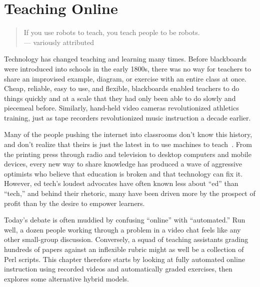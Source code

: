 \chapter{Teaching Online}\label{s:online}

\begin{quote}

  If you use robots to teach, you teach people to be robots. \\
  --- variously attributed

\end{quote}

Technology has changed teaching and learning many times.
Before blackboards were introduced into schools in the early 1800s,
there was no way for teachers to share an improvised example,
diagram,
or exercise with an entire class at once.
Cheap,
reliable,
easy to use,
and flexible,
blackboards enabled teachers to do things quickly and at a scale
that they had only been able to do slowly and piecemeal before.
Similarly,
hand-held video cameras revolutionized athletics training,
just as tape recorders revolutionized music instruction a decade earlier.

Many of the people pushing the internet into classrooms don't know this history,
and don't realize that theirs is just the latest in
to use machines to teach~\cite{Watt2014}.
From the printing press through radio and television
to desktop computers and mobile devices,
every new way to share knowledge has produced a wave of aggressive optimists
who believe that education is broken and that technology can fix it.
However,
ed tech's loudest advocates have often known less about ``ed'' than ``tech,''
and behind their rhetoric,
many have been driven more by the prospect of profit
than by the desire to empower learners.

Today's debate is often muddied by confusing ``online'' with ``automated.''
Run well,
a dozen people working through a problem in a video chat
feels like any other small-group discussion.
Conversely,
a squad of teaching assistants grading hundreds of papers against an inflexible rubric
might as well be a collection of Perl scripts.
This chapter therefore starts by looking at fully automated online instruction
using recorded videos and automatically graded exercises,
then explores some alternative hybrid models.


